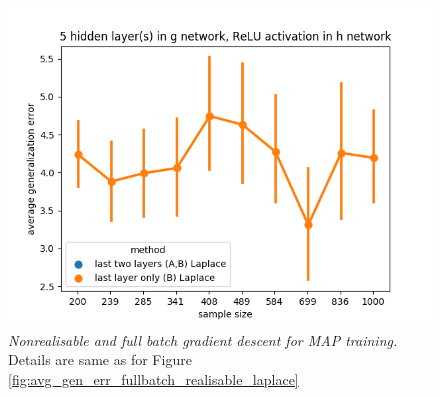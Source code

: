 \documentclass{article} %
\begin{document}
\begin{figure}[t!]
\begin{center}
		\includegraphics[scale=0.35]{laplace_taskid3.png}
	\end{center}
	\caption{\textit{Nonrealisable and full batch gradient descent for MAP training.} Details are same as for Figure \ref{fig:avg_gen_err_fullbatch_realisable_laplace}
	}
	\label{fig:avg_gen_err_fullbatch_nonrealisable_laplace}
\end{figure}
\end{document}
